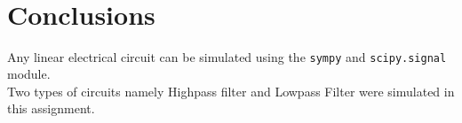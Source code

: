\documentclass[11pt]{article}
\begin{document}
    \begin{center}
    \end{center}
    { \hspace*{\fill} \\}
    
    \begin{center}
    \end{center}
    { \hspace*{\fill} \\}
    
    \begin{center}
    \end{center}
    { \hspace*{\fill} \\}
    
    \begin{center}
    \end{center}
    { \hspace*{\fill} \\}
    
    \hypertarget{conclusions}{%
\section{Conclusions}\label{conclusions}}

Any linear electrical circuit can be simulated using the \texttt{sympy}
and \texttt{scipy.signal} module. \\Two types of circuits namely Highpass
filter and Lowpass Filter were simulated in this assignment.


    
    
    
    
\end{document}
